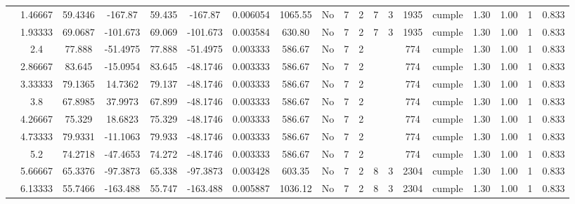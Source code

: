\begin{table}[H]
{\begin{tabular}{|c|c|c|c|c|c|r|c|c|c|c|c|c|c|c|c|c|c|c|}
\cline{2-19}        & 1.46667 & 59.4346 & -167.87 & 59.435 & -167.87 & 0.006054 & 1065.55 & No  & 7   & 2   & 7   & 3   & 1935 & \cellcolor[rgb]{ .776,  .937,  .808}cumple & 1.30 & 1.00 & 1   & 0.833 \bigstrut\\
\cline{2-19}        & 1.93333 & 69.0687 & -101.673 & 69.069 & -101.673 & 0.003584 & 630.80 & No  & 7   & 2   & 7   & 3   & 1935 & \cellcolor[rgb]{ .776,  .937,  .808}cumple & 1.30 & 1.00 & 1   & 0.833 \bigstrut\\
\cline{2-19}        & 2.4 & 77.888 & -51.4975 & 77.888 & -51.4975 & 0.003333 & 586.67 & No  & 7   & 2   &     &     & 774 & \cellcolor[rgb]{ .776,  .937,  .808}cumple & 1.30 & 1.00 & 1   & 0.833 \bigstrut\\
\cline{2-19}        & 2.86667 & 83.645 & -15.0954 & 83.645 & -48.1746 & 0.003333 & 586.67 & No  & 7   & 2   &     &     & 774 & \cellcolor[rgb]{ .776,  .937,  .808}cumple & 1.30 & 1.00 & 1   & 0.833 \bigstrut\\
\cline{2-19}        & 3.33333 & 79.1365 & 14.7362 & 79.137 & -48.1746 & 0.003333 & 586.67 & No  & 7   & 2   &     &     & 774 & \cellcolor[rgb]{ .776,  .937,  .808}cumple & 1.30 & 1.00 & 1   & 0.833 \bigstrut\\
\cline{2-19}        & 3.8 & 67.8985 & 37.9973 & 67.899 & -48.1746 & 0.003333 & 586.67 & No  & 7   & 2   &     &     & 774 & \cellcolor[rgb]{ .776,  .937,  .808}cumple & 1.30 & 1.00 & 1   & 0.833 \bigstrut\\
\cline{2-19}        & 4.26667 & 75.329 & 18.6823 & 75.329 & -48.1746 & 0.003333 & 586.67 & No  & 7   & 2   &     &     & 774 & \cellcolor[rgb]{ .776,  .937,  .808}cumple & 1.30 & 1.00 & 1   & 0.833 \bigstrut\\
\cline{2-19}        & 4.73333 & 79.9331 & -11.1063 & 79.933 & -48.1746 & 0.003333 & 586.67 & No  & 7   & 2   &     &     & 774 & \cellcolor[rgb]{ .776,  .937,  .808}cumple & 1.30 & 1.00 & 1   & 0.833 \bigstrut\\
\cline{2-19}        & 5.2 & 74.2718 & -47.4653 & 74.272 & -48.1746 & 0.003333 & 586.67 & No  & 7   & 2   &     &     & 774 & \cellcolor[rgb]{ .776,  .937,  .808}cumple & 1.30 & 1.00 & 1   & 0.833 \bigstrut\\
\cline{2-19}        & 5.66667 & 65.3376 & -97.3873 & 65.338 & -97.3873 & 0.003428 & 603.35 & No  & 7   & 2   & 8   & 3   & 2304 & \cellcolor[rgb]{ .776,  .937,  .808}cumple & 1.30 & 1.00 & 1   & 0.833 \bigstrut\\
\cline{2-19}        & 6.13333 & 55.7466 & -163.488 & 55.747 & -163.488 & 0.005887 & 1036.12 & No  & 7   & 2   & 8   & 3   & 2304 & \cellcolor[rgb]{ .776,  .937,  .808}cumple & 1.30 & 1.00 & 1   & 0.833 \bigstrut\\

\end{tabular}}
\end{table}
